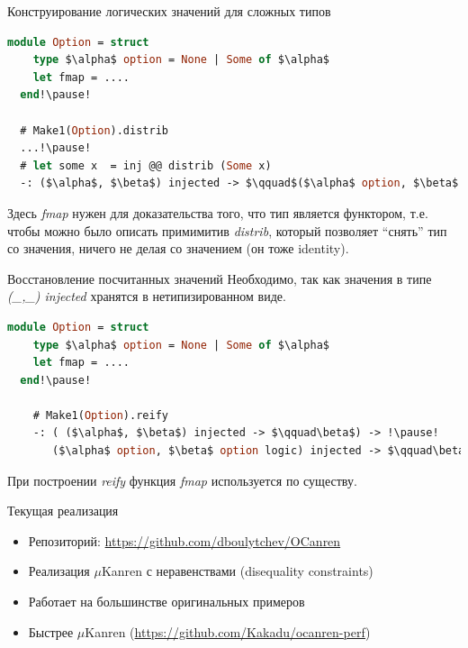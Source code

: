\documentclass[10pt, mathserif]{beamer}
\theoremstyle{definition}
\begin{document}
\begin{frame}[fragile]{Конструирование логических значений для сложных типов}
  \begin{lstlisting}[language=ml,mathescape=true]
  module Option = struct
    type $\alpha$ option = None | Some of $\alpha$
    let fmap = ....
  end!\pause!

  # Make1(Option).distrib
  ...!\pause!
  # let some x  = inj @@ distrib (Some x)
  -: ($\alpha$, $\beta$) injected -> $\qquad$($\alpha$ option, $\beta$ option logic) injected
  \end{lstlisting}
  \pause

  Здесь \emph{fmap} нужен для доказательства того, что тип является функтором, т.е.
  чтобы можно было описать примимитив \emph{distrib}, который позволяет ``снять'' 
  тип со значения, ничего не делая со значением (он тоже identity).

\end{frame}

\begin{frame}[fragile]{Восстановление посчитанных значений}
  Необходимо, так как значения в типе \emph{(\_,\_) injected} хранятся в
  нетипизированном виде.

  \begin{lstlisting}[language=ml,mathescape=true]
  module Option = struct
    type $\alpha$ option = None | Some of $\alpha$
    let fmap = ....
  end!\pause!

    # Make1(Option).reify
    -: ( ($\alpha$, $\beta$) injected -> $\qquad\beta$) -> !\pause!
       ($\alpha$ option, $\beta$ option logic) injected -> $\qquad\beta$ option logic

  \end{lstlisting}

  При построении \emph{reify} функция \emph{fmap} используется по существу.
\end{frame}

\begin{frame}[fragile]{Текущая реализация}
\begin{itemize}
\item Репозиторий: \url{https://github.com/dboulytchev/OCanren}
\item Реализация $\mu$Kanren с неравенствами (disequality constraints)
\item Работает на большинстве оригинальных примеров
\item Быстрее $\mu$Kanren (\url{https://github.com/Kakadu/ocanren-perf})
\end{itemize}

\end{frame}

% 
% 
\end{document}

